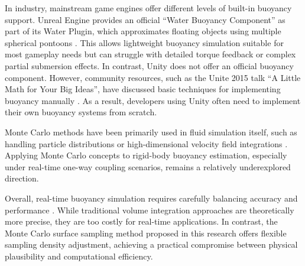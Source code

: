 In industry, mainstream game engines offer different levels of built-in buoyancy support. Unreal Engine provides an official ``Water Buoyancy Component'' as part of its Water Plugin, which approximates floating objects using multiple spherical pontoons \cite{UnrealWaterBuoyancyComponent}. This allows lightweight buoyancy simulation suitable for most gameplay needs but can struggle with detailed torque feedback or complex partial submersion effects. In contrast, Unity does not offer an official buoyancy component. However, community resources, such as the Unite 2015 talk ``A Little Math for Your Big Ideas'', have discussed basic techniques for implementing buoyancy manually \cite{Unite2015ALittle}. As a result, developers using Unity often need to implement their own buoyancy systems from scratch.

Monte Carlo methods have been primarily used in fluid simulation itself, such as handling particle distributions or high-dimensional velocity field integrations \cite{rioux2022monte}\cite{sugimoto2024velocity}. Applying Monte Carlo concepts to rigid-body buoyancy estimation, especially under real-time one-way coupling scenarios, remains a relatively underexplored direction.

Overall, real-time buoyancy simulation requires carefully balancing accuracy and performance \cite{liu2021faster}. While traditional volume integration approaches are theoretically more precise, they are too costly for real-time applications. In contrast, the Monte Carlo surface sampling method proposed in this research offers flexible sampling density adjustment, achieving a practical compromise between physical plausibility and computational efficiency.